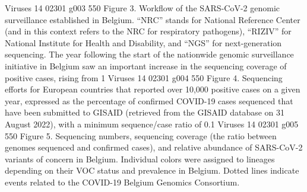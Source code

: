 Viruses 14 02301 g003 550
Figure 3. Workflow of the SARS-CoV-2 genomic surveillance established in Belgium. “NRC” stands for National Reference Center (and in this context refers to the NRC for respiratory pathogens), “RIZIV” for National Institute for Health and Disability, and “NGS” for next-generation sequencing.
The year following the start of the nationwide genomic surveillance initiative in Belgium saw an important increase in the sequencing coverage of positive cases, rising from 1%
Viruses 14 02301 g004 550
Figure 4. Sequencing efforts for European countries that reported over 10,000 positive cases on a given year, expressed as the percentage of confirmed COVID-19 cases sequenced that have been submitted to GISAID (retrieved from the GISAID database on 31 August 2022), with a minimum sequence/case ratio of 0.1%
Viruses 14 02301 g005 550
Figure 5. Sequencing numbers, sequencing coverage (the ratio between genomes sequenced and confirmed cases), and relative abundance of SARS-CoV-2 variants of concern in Belgium. Individual colors were assigned to lineages depending on their VOC status and prevalence in Belgium. Dotted lines indicate events related to the COVID-19 Belgium Genomics Consortium.

